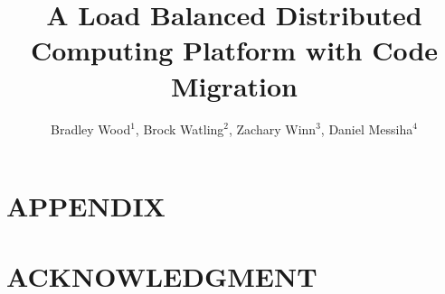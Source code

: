 \documentclass[letterpaper, 11 pt, conference]{ieeeconf}
\title{A Load Balanced Distributed Computing Platform with Code Migration}
\author{Bradley Wood$^{1}$, Brock Watling$^{2}$, Zachary Winn$^{3}$, Daniel Messiha$^{4}$}
\begin{document}
    \maketitle
    \thispagestyle{empty}
    \pagestyle{empty}

    

    

    

    

    

    

    \addtolength{\textheight}{-12cm}   %

    \section*{APPENDIX}

    \section*{ACKNOWLEDGMENT}


    \begin{thebibliography}{99}

    \end{thebibliography}
\end{document}

